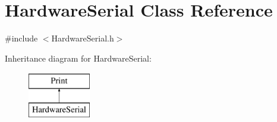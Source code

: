 \hypertarget{class_hardware_serial}{
\section{HardwareSerial Class Reference}
\label{class_hardware_serial}
}


{\ttfamily \#include $<$HardwareSerial.h$>$}

Inheritance diagram for HardwareSerial:\begin{figure}[H]
\begin{center}
\leavevmode
\includegraphics[height=2.000000cm]{class_hardware_serial}
\end{center}
\end{figure}
